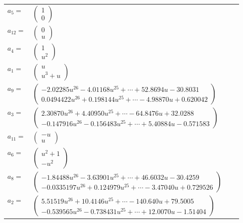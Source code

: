 \documentclass[1p]{elsarticle_modified}
\theoremstyle{definition}
\begin{document}
\begin{tabular}{m{7pt} m{180pt} m{7pt} m{180pt} }
\flushright $a_{5}=$&$\begin{pmatrix}1\\0\end{pmatrix}$ \\
\flushright $a_{12}=$&$\begin{pmatrix}0\\u\end{pmatrix}$ \\
\flushright $a_{4}=$&$\begin{pmatrix}1\\u^2\end{pmatrix}$ \\
\flushright $a_{1}=$&$\begin{pmatrix}u\\u^3+u\end{pmatrix}$ \\
\flushright $a_{9}=$&$\begin{pmatrix}-2.02285 u^{26}-4.01168 u^{25}+\cdots+52.8694 u-30.8031\\0.0494422 u^{26}+0.198144 u^{25}+\cdots-4.98870 u+0.620042\end{pmatrix}$ \\
\flushright $a_{3}=$&$\begin{pmatrix}2.30870 u^{26}+4.40950 u^{25}+\cdots-64.8476 u+32.0288\\-0.147916 u^{26}-0.156483 u^{25}+\cdots+5.40884 u-0.571583\end{pmatrix}$ \\
\flushright $a_{11}=$&$\begin{pmatrix}- u\\u\end{pmatrix}$ \\
\flushright $a_{6}=$&$\begin{pmatrix}u^2+1\\- u^2\end{pmatrix}$ \\
\flushright $a_{8}=$&$\begin{pmatrix}-1.84488 u^{26}-3.63901 u^{25}+\cdots+46.6032 u-30.4259\\-0.0335197 u^{26}+0.124979 u^{25}+\cdots-3.47040 u+0.729526\end{pmatrix}$ \\
\flushright $a_{2}=$&$\begin{pmatrix}5.51519 u^{26}+10.4146 u^{25}+\cdots-140.640 u+79.5005\\-0.539565 u^{26}-0.738431 u^{25}+\cdots+12.0070 u-1.51404\end{pmatrix}$ \\

\end{tabular}
\end{document}
